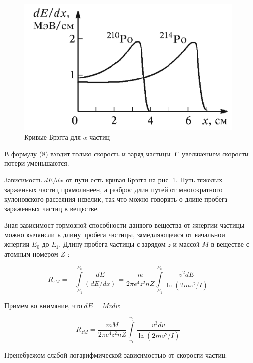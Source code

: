 \documentclass[a4paper]{article}
\begin{document}
\begin{figure}
    \includegraphics[scale = 0.6]{picbreg.png}
    \caption{Кривые Брэгга для $\alpha$-частиц}
    \label{ris breg}
\end{figure}

В формулу (8) входит только скорость и заряд частицы. С увеличением скорости потери уменьшаются.\par 

Зависимость $dE/dx$ от пути есть кривая Брэгга на рис. \ref{ris breg}. Путь тяжелых зарженных частиц прямолинеен, 
а разброс длин путей от многократного кулоновского рассеяния невелик, так что можно говорить о длине пробега заряженных частиц 
в веществе. \par 

Зная зависимост тормозной способности данного вещества от жнергии частицы можно вычяислить длину пробега частицы, замедляющейся 
от начальной жнергии $E_0$ до $E_1$. Длину пробега частицы с зарядом $z$ и массой $M$ в веществе с атомным номером $Z$ :

\begin{equation}
    R_{zM} = - \int\limits _{E_1}^{E_0} \frac{dE}{(dE / dx)} = \frac{m}{2 \pi e^4 z^2 n Z} \int\limits_{E_1}^{E_0} \frac{v^2 dE}{\ln{(2mv^2/\bar{I})}}
\end{equation}

Примем во внимание, что $dE = Mvdv$:

\begin{equation}
    R_{zM} = \frac{m M}{2 \pi e^4 z^2 n Z} \int\limits_{v_1}^{v_0} \frac{v^3 dv}{\ln{(2mv^2/\bar{I})}}
\end{equation}

Пренебрежом слабой логарифмической зависимостью от скорости частиц:
\end{document}
